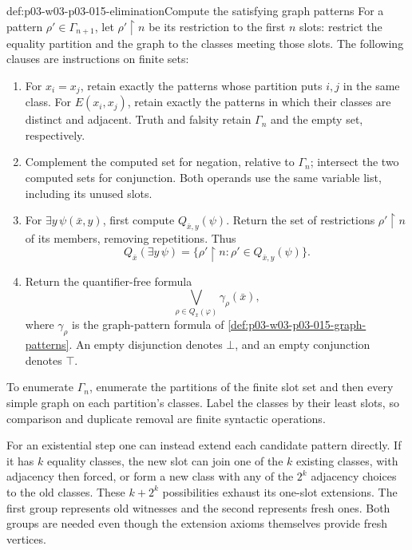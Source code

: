 \begin{hbmethod}{def:p03-w03-p03-015-elimination}{Compute the satisfying graph patterns}
For a pattern \(\rho'\in\Gamma_{n+1}\), let
\(\rho'\mathbin{\upharpoonright}n\) be its restriction to the first
\(n\) slots: restrict the equality partition and the graph to the
classes meeting those slots. The following clauses are instructions on
finite sets:
\begin{enumerate}
\item For \(x_i=x_j\), retain exactly the patterns whose partition puts
      \(i,j\) in the same class. For \(E(x_i,x_j)\), retain exactly the
      patterns in which their classes are distinct and adjacent.
      Truth and falsity retain \(\Gamma_n\) and the empty set,
      respectively.
\item Complement the computed set for negation, relative to
      \(\Gamma_n\); intersect the two computed sets for conjunction.
      Both operands use the same variable list, including its unused slots.
\item For \(\exists y\,\psi(\bar x,y)\), first compute
      \(Q_{\bar x,y}(\psi)\). Return the set of restrictions
      \(\rho'\mathbin{\upharpoonright}n\) of its members, removing
      repetitions. Thus
      \[
       Q_{\bar x}(\exists y\,\psi)
       =\{\rho'\mathbin{\upharpoonright}n:
                    \rho'\in Q_{\bar x,y}(\psi)\}.
      \]
\item Return the quantifier-free formula
      \[
       \bigvee_{\rho\in Q_{\bar x}(\varphi)}\gamma_\rho(\bar x),
      \]
      where \(\gamma_\rho\) is the graph-pattern formula of
      \cref{def:p03-w03-p03-015-graph-patterns}. An empty disjunction
      denotes \(\bot\), and an empty conjunction denotes \(\top\).
\end{enumerate}
To enumerate \(\Gamma_n\), enumerate the partitions of the finite slot
set and then every simple graph on each partition's classes. Label the
classes by their least slots, so comparison and duplicate removal are
finite syntactic operations.
\end{hbmethod}

For an existential step one can instead extend each candidate pattern
directly. If it has \(k\) equality classes, the new slot can join one of
the \(k\) existing classes, with adjacency then forced, or form a new
class with any of the \(2^k\) adjacency choices to the old classes.
These \(k+2^k\) possibilities exhaust its one-slot extensions. The
first group represents old witnesses and the second represents fresh
ones. Both groups are needed even though the extension axioms themselves
provide fresh vertices.

